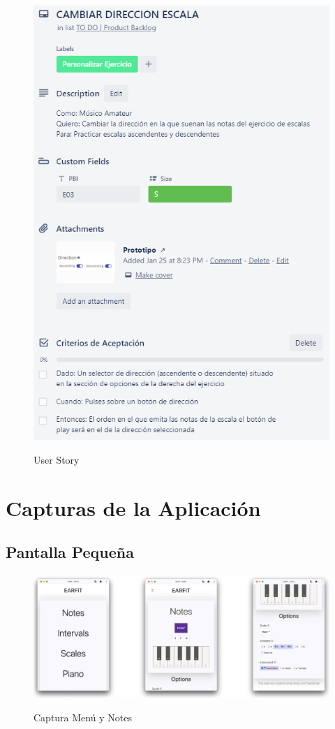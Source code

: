 \documentclass[12pt,twoside,titlepage]{report}
\begin{document}
\begin{figure}[H]
    \centering
    \includegraphics[scale=1.3]{Scrum/User Stories/EscalasDireccion}
    \label{fig:EscalasDireccion}
    \caption{User Story}
\end{figure}

\chapter{Capturas de la Aplicación}

\section{Pantalla Pequeña}

\begin{figure}[H]
    \centering
    \includegraphics[scale=0.7]{Capturas Earfit/Movil/Movil1}
    \label{fig:Movil1}
    \caption{Captura Menú y Notes}
\end{figure}
\end{document}
